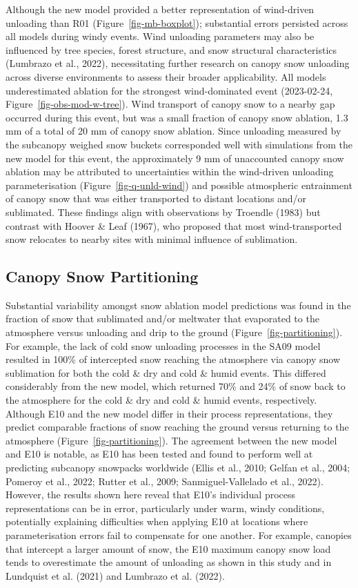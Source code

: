 \documentclass[
  letterpaper,
]{tex/uofsthesis-cs}
\begin{document}
Although the new model provided a better representation of wind-driven
unloading than R01 (Figure~\ref{fig-mb-boxplot}); substantial errors
persisted across all models during windy events. Wind unloading
parameters may also be influenced by tree species, forest structure, and
snow structural characteristics (Lumbrazo et al., 2022), necessitating
further research on canopy snow unloading across diverse environments to
assess their broader applicability. All models underestimated ablation
for the strongest wind-dominated event (2023-02-24,
Figure~\ref{fig-obs-mod-w-tree}). Wind transport of canopy snow to a
nearby gap occurred during this event, but was a small fraction of
canopy snow ablation, 1.3 mm of a total of 20 mm of canopy snow
ablation. Since unloading measured by the subcanopy weighed snow buckets
corresponded well with simulations from the new model for this event,
the approximately 9 mm of unaccounted canopy snow ablation may be
attributed to uncertainties within the wind-driven unloading
parameterisation (Figure~\ref{fig-q-unld-wind}) and possible atmospheric
entrainment of canopy snow that was either transported to distant
locations and/or sublimated. These findings align with observations by
Troendle (1983) but contrast with Hoover \& Leaf (1967), who proposed
that most wind-transported snow relocates to nearby sites with minimal
influence of sublimation.

\subsection{Canopy Snow Partitioning}\label{canopy-snow-partitioning-1}

Substantial variability amongst snow ablation model predictions was
found in the fraction of snow that sublimated and/or meltwater that
evaporated to the atmosphere versus unloading and drip to the ground
(Figure~\ref{fig-partitioning}). For example, the lack of cold snow
unloading processes in the SA09 model resulted in 100\% of intercepted
snow reaching the atmosphere via canopy snow sublimation for both the
cold \& dry and cold \& humid events. This differed considerably from
the new model, which returned 70\% and 24\% of snow back to the
atmosphere for the cold \& dry and cold \& humid events, respectively.
Although E10 and the new model differ in their process representations,
they predict comparable fractions of snow reaching the ground versus
returning to the atmosphere (Figure~\ref{fig-partitioning}). The
agreement between the new model and E10 is notable, as E10 has been
tested and found to perform well at predicting subcanopy snowpacks
worldwide (Ellis et al., 2010; Gelfan et al., 2004; Pomeroy et al.,
2022; Rutter et al., 2009; Sanmiguel-Vallelado et al., 2022). However,
the results shown here reveal that E10's individual process
representations can be in error, particularly under warm, windy
conditions, potentially explaining difficulties when applying E10 at
locations where parameterisation errors fail to compensate for one
another. For example, canopies that intercept a larger amount of snow,
the E10 maximum canopy snow load tends to overestimate the amount of
unloading as shown in this study and in Lundquist et al. (2021) and
Lumbrazo et al. (2022).
\end{document}
